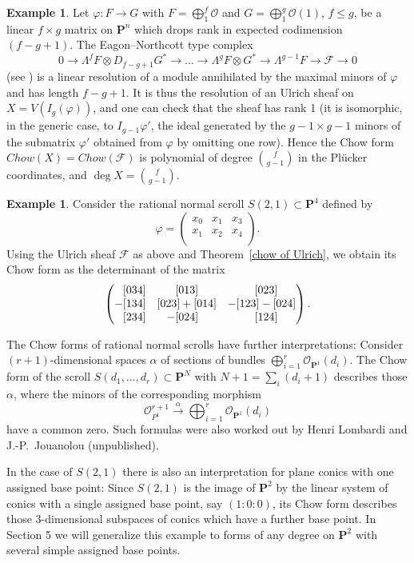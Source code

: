 \documentclass{jams-l}
\theoremstyle{definition}
\newtheorem{example}[theorem]{Example}
\theoremstyle{remark}
\newcommand{\cF}{{\mathcal F}}
\newcommand{\Ocal}{{\mathcal O}}
\newcommand{\cO}{{\mathcal O}}
\newcommand{\PP}{{\mathbf P}}
\newcommand{\tensor}{\otimes}
\newcommand{\rTo}{\xrightarrow}
\begin{document}
\begin{example}\label{linear determinantal varieties} 
Let $\varphi \colon F \to G$
with $F=\bigoplus_1^f \cO$ and $G=\bigoplus_1^g \cO(1)$, $f\le g$, be a linear 
$f \times g$ matrix on $\PP^n$ which drops rank in expected
codimension $(f-g+1)$. The Eagon--Northcott type complex 
\[
0 \to \Lambda^f F \tensor D_{f-g+1} G^* \to \ldots \to \Lambda^{g} F
\tensor G^* \to \Lambda^{g-1} F \to \cF \to 0
\]
(see \cite[Theorem A2.10]{Eisenbud 1995}) is a linear resolution of a module
annihilated by the maximal minors of $\varphi$ and has
length $f-g+1$. It is thus the resolution
of an Ulrich sheaf
on $X = V(I_g(\varphi))$, and one can check that the sheaf has rank
1 (it is isomorphic, in the generic case, to $I_{g-1}\varphi'$,
the ideal generated by the $g-1\times g-1$ minors of the submatrix
$\varphi'$ obtained from $\varphi$ by omitting one row). Hence the
Chow form
$Chow(X)=Chow(\cF)$ is polynomial of degree $f \choose {g-1}$ in the Pl\"ucker
coordinates, and $\deg X = {f \choose {g-1}}$. 
\end{example}
  
\begin{example}\label{cubic scroll} Consider the rational normal
scroll $S(2,1) \subset \PP^4$ defined by
\[ \varphi=\begin{pmatrix}x_0&x_1&x_3 \\ x_1 & x_2 & x_4 \\\end{pmatrix}.\]
Using the Ulrich sheaf $\cF$ as above and 
Theorem~\ref{chow of Ulrich}, we obtain its Chow form as the determinant
of the matrix
\[\def~{\phantom{+}}  
\begin{pmatrix} 
~[034] & [013]       & ~[023] \\
-[134] & [023]+[014] & -[123]-[024] \\
~[234] & \llap{$-$}[024]   & ~[124] \\ \end{pmatrix}. 
\]

The Chow forms of  rational normal scrolls have further interpretations:
Consider $(r+1)$-dimensional spaces $\alpha$ of sections of bundles
$\bigoplus_{i=1}^r \Ocal_{\PP^1}(d_i)$. The Chow form of the scroll $S(d_1,\ldots,d_r)
\subset \PP^N$ with $N+1=\sum_i (d_i+1)$ describes those $\alpha$, 
where the minors of the 
corresponding morphism
\[ 
\Ocal_{P^1}^{r+1} \rTo{\alpha} \bigoplus_{i=1}^r \Ocal_{\PP^1}(d_i)
\]
have a common zero. Such formulas were also worked out
by Henri Lombardi and J.-P.~Jouanolou (unpublished).
 
In the case of
$S(2,1)$ there is also an interpretation for plane conics with one assigned 
base point: Since $S(2,1)$ is the image of $\PP^2$ 
by the linear system of conics with
a single assigned base point, say $(1:0:0)$, its Chow form describes
those 3-dimensional subspaces of conics which have a further base point.
In Section 5 we will generalize this example to forms of any degree on 
$\PP^2$ with several simple assigned base points.
\end{example}
\end{document}
